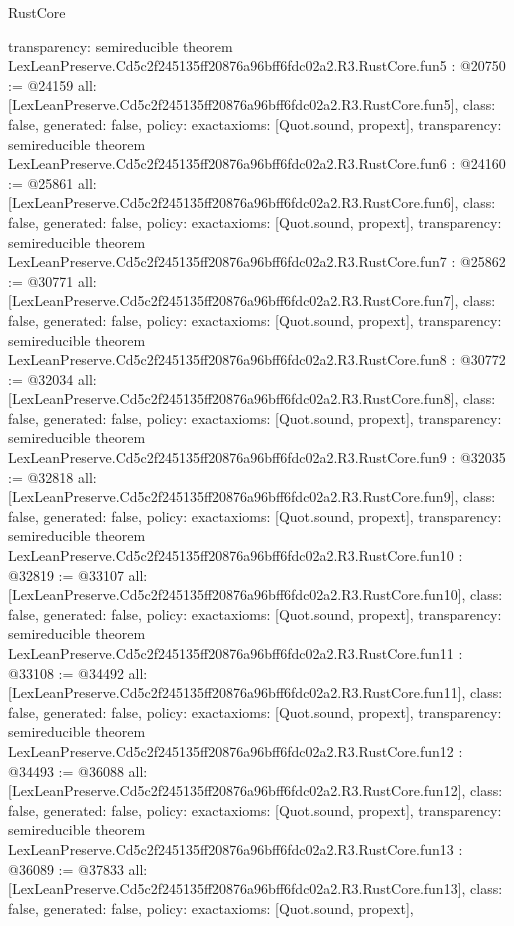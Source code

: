 \begin{lexlean}{RustCore}
\begin{coremodule}
{  transparency: semireducible
}
theorem LexLeanPreserve.Cd5c2f245135ff20876a96bff6fdc02a2.R3.RustCore.fun5 : @20750 := @24159 {
  all: [LexLeanPreserve.Cd5c2f245135ff20876a96bff6fdc02a2.R3.RustCore.fun5],
  class: false,
  generated: false,
  policy: exact{axioms: [Quot.sound, propext]},
  transparency: semireducible
}
theorem LexLeanPreserve.Cd5c2f245135ff20876a96bff6fdc02a2.R3.RustCore.fun6 : @24160 := @25861 {
  all: [LexLeanPreserve.Cd5c2f245135ff20876a96bff6fdc02a2.R3.RustCore.fun6],
  class: false,
  generated: false,
  policy: exact{axioms: [Quot.sound, propext]},
  transparency: semireducible
}
theorem LexLeanPreserve.Cd5c2f245135ff20876a96bff6fdc02a2.R3.RustCore.fun7 : @25862 := @30771 {
  all: [LexLeanPreserve.Cd5c2f245135ff20876a96bff6fdc02a2.R3.RustCore.fun7],
  class: false,
  generated: false,
  policy: exact{axioms: [Quot.sound, propext]},
  transparency: semireducible
}
theorem LexLeanPreserve.Cd5c2f245135ff20876a96bff6fdc02a2.R3.RustCore.fun8 : @30772 := @32034 {
  all: [LexLeanPreserve.Cd5c2f245135ff20876a96bff6fdc02a2.R3.RustCore.fun8],
  class: false,
  generated: false,
  policy: exact{axioms: [Quot.sound, propext]},
  transparency: semireducible
}
theorem LexLeanPreserve.Cd5c2f245135ff20876a96bff6fdc02a2.R3.RustCore.fun9 : @32035 := @32818 {
  all: [LexLeanPreserve.Cd5c2f245135ff20876a96bff6fdc02a2.R3.RustCore.fun9],
  class: false,
  generated: false,
  policy: exact{axioms: [Quot.sound, propext]},
  transparency: semireducible
}
theorem LexLeanPreserve.Cd5c2f245135ff20876a96bff6fdc02a2.R3.RustCore.fun10 : @32819 := @33107 {
  all: [LexLeanPreserve.Cd5c2f245135ff20876a96bff6fdc02a2.R3.RustCore.fun10],
  class: false,
  generated: false,
  policy: exact{axioms: [Quot.sound, propext]},
  transparency: semireducible
}
theorem LexLeanPreserve.Cd5c2f245135ff20876a96bff6fdc02a2.R3.RustCore.fun11 : @33108 := @34492 {
  all: [LexLeanPreserve.Cd5c2f245135ff20876a96bff6fdc02a2.R3.RustCore.fun11],
  class: false,
  generated: false,
  policy: exact{axioms: [Quot.sound, propext]},
  transparency: semireducible
}
theorem LexLeanPreserve.Cd5c2f245135ff20876a96bff6fdc02a2.R3.RustCore.fun12 : @34493 := @36088 {
  all: [LexLeanPreserve.Cd5c2f245135ff20876a96bff6fdc02a2.R3.RustCore.fun12],
  class: false,
  generated: false,
  policy: exact{axioms: [Quot.sound, propext]},
  transparency: semireducible
}
theorem LexLeanPreserve.Cd5c2f245135ff20876a96bff6fdc02a2.R3.RustCore.fun13 : @36089 := @37833 {
  all: [LexLeanPreserve.Cd5c2f245135ff20876a96bff6fdc02a2.R3.RustCore.fun13],
  class: false,
  generated: false,
  policy: exact{axioms: [Quot.sound, propext]},
}
\end{coremodule}
\end{lexlean}
